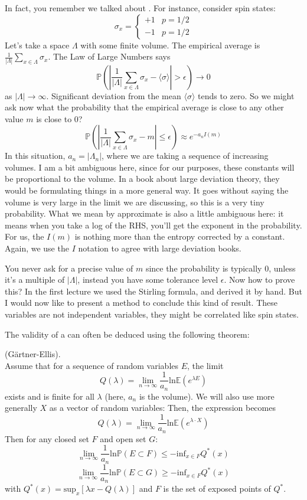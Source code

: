 In fact, you remember we talked about . For instance, consider spin states: 
\[
\sigma_x = 
\begin{cases}
+1 & p = 1/2 \\
-1 & p = 1/2
\end{cases}
\]
Let's take a space $\Lambda$ with some finite volume. The empirical average is $\frac{1}{|\Lambda|} \sum_{x \in \Lambda} \sigma_x$. The Law of Large Numbers says 
\[
\mathbb{P}\left(\left|\frac{1}{|\Lambda|} \sum_{x \in \Lambda} \sigma_x - \langle \sigma \rangle \right| > \epsilon \right) \to 0
\]
as $|\Lambda| \to \infty$. Significant deviation from the mean $\langle \sigma \rangle$ tends to zero. So we might ask now what the probability that the empirical average is close to any other value $m$ is close to $0$? 
\[
\mathbb{P}\left(\left|\frac{1}{|\Lambda|} \sum_{x \in \Lambda} \sigma_x - m\right| \leq \epsilon \right) \approx e^{-a_n I(m)}
\]
In this situation, $a_n = |\Lambda_n|$, where we are taking a sequence of increasing volumes. I am a bit ambiguous here, since for our purposes, these constants will be proportional to the volume. In a book about large deviation theory, they would be formulating things in a more general way. It goes without saying the volume is very large in the limit we are discussing, so this is a very tiny probability. What we mean by approximate is also a little ambiguous here: it means when you take a log of the RHS, you'll get the exponent in the probability. For us, the $I(m)$ is nothing more than the entropy corrected by a constant. Again, we use the $I$ notation to agree with large deviation books. 

You never ask for a precise value of $m$ since the probability is typically $0$, unless it's a multiple of $|\Lambda|$, instead you have some tolerance level $\epsilon$. Now how to prove this? In the first lecture we used the Stirling formula, and derived it by hand. But I would now like to present a method to conclude this kind of result. These variables are not independent variables, they might be correlated like spin states. 

The validity of a  can often be deduced using the following theorem: 
\begin{thm}  (G{\"a}rtner-Ellis). \\
Assume that for a sequence of random variables $E$, the limit
\[
Q(\lambda) = \lim_{n \to \infty}\frac{1}{a_n} \text{ln} \mathbb{E}\left(e^{\lambda E}\right)
\]
exists and is finite for all $\lambda$ (here, $a_n$ is the volume).
We will also use more generally $X$ as a vector of random variables: Then, the expression becomes
\[
Q(\lambda) = \lim_{n \to \infty}\frac{1}{a_n} \text{ln} \mathbb{E}\left(e^{\lambda \cdot X}\right)
\]
Then for any closed set $F$ and open set $G$: 
\[
\lim_{n \to \infty} \frac{1}{a_n} \text{ln}\mathbb{P}(E \subset F) \leq -\text{inf}_{x \in F} Q^*(x)
\]
\[
\lim_{n \to \infty} \frac{1}{a_n} \text{ln}\mathbb{P}(E \subset G) \geq -\text{inf}_{x \in F} Q^*(x)
\]
with $Q^*(x) = \text{sup}_x \left[\lambda x - Q(\lambda)\right]$ and $F$ is the set of exposed points of $Q^*$. 
\end{thm}

